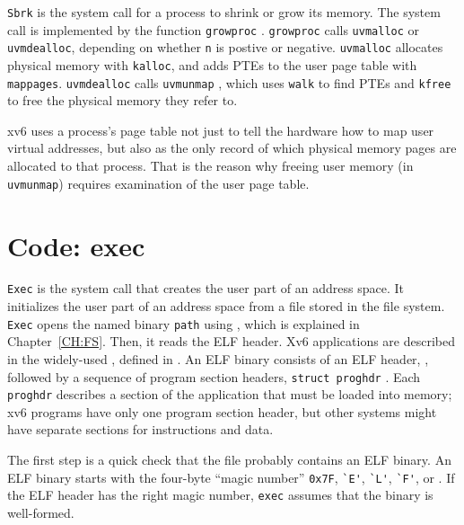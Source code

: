 \lstinline{Sbrk}
is the system call for a process to shrink or grow its memory. The system
call is implemented by the function
\lstinline{growproc}
.
\lstinline{growproc} calls \lstinline{uvmalloc} or
\lstinline{uvmdealloc}, depending on whether \lstinline{n} is postive
or negative.
\lstinline{uvmalloc}
allocates physical memory with {\tt kalloc},
and adds PTEs to the user page table with {\tt mappages}.
\lstinline{uvmdealloc} calls
{\tt uvmunmap}
,
which uses {\tt walk} to find PTEs and
{\tt kfree} to free the physical memory they refer to.

xv6 uses a process's page table not just to tell the hardware how to
map user virtual addresses, but also as the only record of which
physical memory pages are allocated to that process. That is the
reason why freeing user memory (in {\tt uvmunmap}) requires
examination of the user page table.

\section{Code: exec}
\lstinline{Exec}
is the system call that creates the user part of an address space.  It
initializes the user part of an address space from a file stored in the file
system.
\lstinline{Exec}
opens the named binary
\lstinline{path}
using
,
which is explained in Chapter~\ref{CH:FS}.
Then, it reads the ELF header. Xv6 applications are described in the widely-used
,
defined in
.
An ELF binary consists of an ELF header,
,
followed by a sequence of program section headers,
\lstinline{struct proghdr}
.
Each
\lstinline{proghdr}
describes a section of the application that must be loaded into memory;
xv6 programs have only one program section header, but
other systems might have separate sections
for instructions and data.

The first step is a quick check that the file probably contains an
ELF binary.
An ELF binary starts with the four-byte ``magic number''
\lstinline{0x7F},
\lstinline{`E'},
\lstinline{`L'},
\lstinline{`F'},
or
.
If the ELF header has the right magic number,
\lstinline{exec}
assumes that the binary is well-formed.

